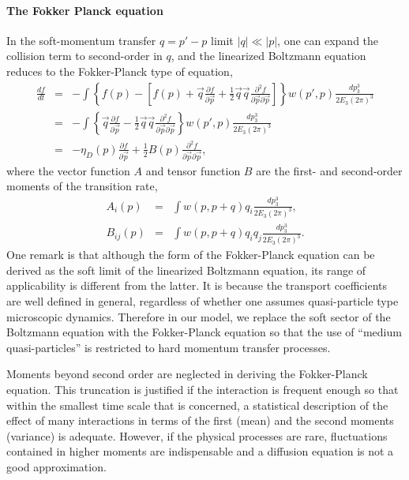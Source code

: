 \paragraph{The Fokker Planck equation}
In the soft-momentum transfer $q = p'-p$ limit  $|q| \ll |p|$, one can expand the collision term to second-order in $q$, and the linearized Boltzmann equation reduces to the Fokker-Planck type of equation,
\begin{eqnarray}
\frac{df}{dt} &=& - \int \left\{
f(p) - \left[f(p) +  \vec{q}\frac{\partial f}{\partial\vec{p}} + \frac{1}{2}\vec{q}\vec{q}\frac{\partial^2 f}{\partial\vec{p} \partial\vec{p}} \right]
\right\} w(p',p)\frac{dp_3^3}{2E_3 (2\pi)^3} \\
&=& - \int \left\{ \vec{q}\frac{\partial f}{\partial\vec{p}} - \frac{1}{2}\vec{q}\vec{q}\frac{\partial^2 f}{\partial\vec{p} \partial\vec{p}}
\right\} w(p',p)\frac{dp_3^3}{2E_3 (2\pi)^3} \\
&=&  -\eta_D(p) \frac{\partial f}{\partial\vec{p}} + \frac{1}{2}B(p)\frac{\partial^2 f}{\partial\vec{p} \partial\vec{p}},
\end{eqnarray}
where the vector function $A$ and tensor function $B$ are the first- and second-order moments of the transition rate,
\begin{eqnarray}
A_i(p) &=& \int w(p,p+q) q_i \frac{dp_3^3}{2E_3 (2\pi)^3},\\
B_{ij}(p) &=& \int w(p,p+q) q_i q_j \frac{dp_3^3}{2E_3 (2\pi)^3}.
\end{eqnarray}
One remark is that although the form of the Fokker-Planck equation can be derived as the soft limit of the linearized Boltzmann equation, its range of applicability is different from the latter.
It is because the transport coefficients are well defined in general, regardless of whether one assumes quasi-particle type microscopic dynamics.
Therefore in our model, we replace the soft sector of the Boltzmann equation with the Fokker-Planck equation so that the use of ``medium quasi-particles'' is restricted to hard momentum transfer processes.

Moments beyond second order are neglected in deriving the Fokker-Planck equation. 
This truncation is justified if the interaction is frequent enough so that within the smallest time scale that is concerned, a statistical description of the effect of many interactions in terms of the first (mean) and the second moments (variance) is adequate.
However, if the physical processes are rare, fluctuations contained in higher moments are indispensable and a diffusion equation is not a good approximation.

